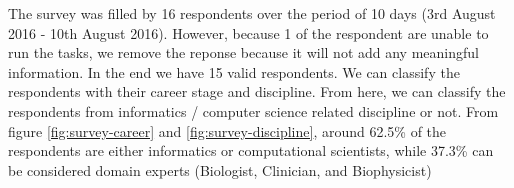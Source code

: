\vspace{1cm}

\vspace{1cm}

\noindent%
\begin{minipage}{\linewidth}%
 \label{fig:survey-discipline}%
\end{minipage}

\vspace{1cm}


The survey was filled by 16 respondents over the period of 10 days (3rd August 2016 - 10th August 2016). However, because 1 of the respondent are unable to run the tasks, we remove the reponse because it will not add any meaningful information. In the end we have 15 valid respondents. We can classify the respondents with their career stage and discipline. From here, we can classify the respondents from informatics / computer science related discipline or not. From figure \ref{fig:survey-career} and \ref{fig:survey-discipline}, around 62.5\% of the respondents are either informatics or computational scientists, while 37.3\% can be considered domain experts (Biologist, Clinician, and Biophysicist)

\vspace{1cm}

